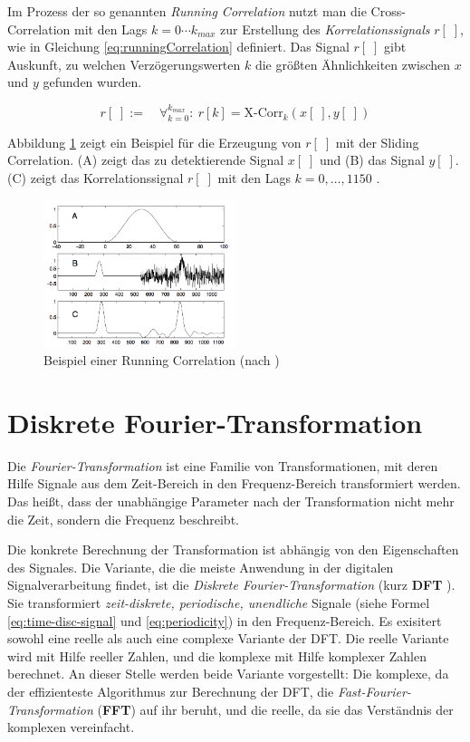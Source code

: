 Im Prozess der so genannten \emph{Running Correlation} nutzt man die Cross-Correlation mit den Lags $k = 0 \cdots k_{max}$ zur Erstellung des \emph{Korrelationssignals} $r[\;]$, wie in Gleichung \ref{eq:runningCorrelation} definiert. Das Signal $r[\;]$ gibt Auskunft, zu welchen Verzögerungswerten $k$ die größten Ähnlichkeiten zwischen $x$ und $y$ gefunden wurden. 

\begin{equation}
r[\;] := \quad \mathop{\forall}_{k = 0}^{k_{max}} :\ r[k] = \text{X-Corr}_k(x[\;],y[\;])
\label{eq:runningCorrelation}
\end{equation}

Abbildung \ref{img:slidingCorrelation} zeigt ein Beispiel für die Erzeugung von $r[\;]$ mit der Sliding Correlation. (A) zeigt das zu detektierende Signal $x[\;]$ und (B) das Signal $y[\;]$. (C) zeigt das Korrelationssignal $r[\;]$ mit den Lags $k = 0, \ldots ,1150$ . \cite[S. 47 - 48]{dspMichigan}

\begin{figure}[h]
	\centering
	\includegraphics[width=0.5\textwidth]{bilder/slidingCorrelation.png}
	\caption{Beispiel einer Running Correlation (nach \cite[S. 48]{dspMichigan})}
	\label{img:slidingCorrelation}
\end{figure}


\section{Diskrete Fourier-Transformation}

Die \emph{Fourier-Transformation} ist eine Familie von Transformationen, mit deren Hilfe Signale aus dem Zeit-Bereich in den Frequenz-Bereich transformiert werden. Das heißt, dass der unabhängige Parameter nach der Transformation nicht mehr die Zeit, sondern die Frequenz beschreibt. 

Die konkrete Berechnung der Transformation ist abhängig von den Eigenschaften des Signales. Die Variante, die die meiste Anwendung in der digitalen Signalverarbeitung findet, ist die \emph{Diskrete Fourier-Transformation} (kurz \textbf{DFT} ). Sie transformiert \emph{zeit-diskrete, periodische, unendliche} Signale (siehe Formel \ref{eq:time-disc-signal} und \ref{eq:periodicity}) in den Frequenz-Bereich. Es exisitert sowohl eine reelle als auch eine complexe Variante der DFT. Die reelle Variante wird mit Hilfe reeller Zahlen, und die komplexe mit Hilfe komplexer Zahlen berechnet. An dieser Stelle werden beide Variante vorgestellt: Die komplexe, da der effizienteste Algorithmus zur Berechnung der DFT, die \emph{Fast-Fourier-Transformation} (\textbf{FFT}) auf ihr beruht, und die reelle, da sie das Verständnis der komplexen vereinfacht.\cite[S. 142 - 146]{dspGuide}

